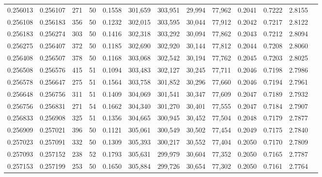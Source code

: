 \begin{tabular}{rrrrrrrrrrrrr}
0.256013 & 0.256107 &   271 &  50 &                                     0.1558 & 301,659 & 303,951 &  29,994 &  77,962 & 0.2041 & 0.7222 & 2.8155 \\
0.256108 & 0.256183 &   356 &  50 &                                     0.1232 & 302,015 & 303,595 &  30,044 &  77,912 & 0.2042 & 0.7217 & 2.8122 \\
0.256183 & 0.256274 &   303 &  50 &                                     0.1416 & 302,318 & 303,292 &  30,094 &  77,862 & 0.2043 & 0.7212 & 2.8094 \\
0.256275 & 0.256407 &   372 &  50 &                                     0.1185 & 302,690 & 302,920 &  30,144 &  77,812 & 0.2044 & 0.7208 & 2.8060 \\
0.256408 & 0.256507 &   378 &  50 &                                     0.1168 & 303,068 & 302,542 &  30,194 &  77,762 & 0.2045 & 0.7203 & 2.8025 \\
0.256508 & 0.256576 &   415 &  51 &                                     0.1094 & 303,483 & 302,127 &  30,245 &  77,711 & 0.2046 & 0.7198 & 2.7986 \\
0.256578 & 0.256647 &   275 &  51 &                                     0.1564 & 303,758 & 301,852 &  30,296 &  77,660 & 0.2046 & 0.7194 & 2.7961 \\
0.256648 & 0.256756 &   311 &  51 &                                     0.1409 & 304,069 & 301,541 &  30,347 &  77,609 & 0.2047 & 0.7189 & 2.7932 \\
0.256756 & 0.256831 &   271 &  54 &                                     0.1662 & 304,340 & 301,270 &  30,401 &  77,555 & 0.2047 & 0.7184 & 2.7907 \\
0.256833 & 0.256908 &   325 &  51 &                                     0.1356 & 304,665 & 300,945 &  30,452 &  77,504 & 0.2048 & 0.7179 & 2.7877 \\
0.256909 & 0.257021 &   396 &  50 &                                     0.1121 & 305,061 & 300,549 &  30,502 &  77,454 & 0.2049 & 0.7175 & 2.7840 \\
0.257023 & 0.257091 &   332 &  50 &                                     0.1309 & 305,393 & 300,217 &  30,552 &  77,404 & 0.2050 & 0.7170 & 2.7809 \\
0.257093 & 0.257152 &   238 &  52 &                                     0.1793 & 305,631 & 299,979 &  30,604 &  77,352 & 0.2050 & 0.7165 & 2.7787 \\
0.257153 & 0.257199 &   253 &  50 &                                     0.1650 & 305,884 & 299,726 &  30,654 &  77,302 & 0.2050 & 0.7161 & 2.7764 \\

\end{tabular}
